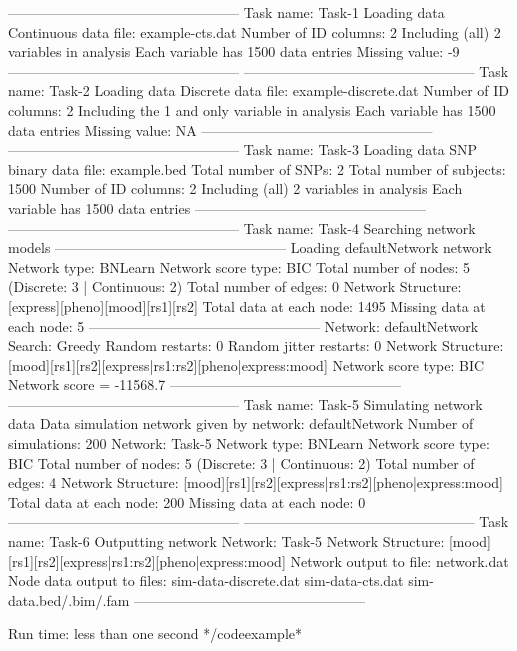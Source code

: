 -------------------------------------------------- Task name: Task-1 Loading data Continuous data file: example-cts.dat Number of ID columns: 2 Including (all) 2 variables in analysis Each variable has 1500 data entries Missing value: -9 -------------------------------------------------- -------------------------------------------------- Task name: Task-2 Loading data Discrete data file: example-discrete.dat Number of ID columns: 2 Including the 1 and only variable in analysis Each variable has 1500 data entries Missing value: NA -------------------------------------------------- -------------------------------------------------- Task name: Task-3 Loading data SNP binary data file: example.bed Total number of SNPs: 2 Total number of subjects: 1500 Number of ID columns: 2 Including (all) 2 variables in analysis Each variable has 1500 data entries -------------------------------------------------- -------------------------------------------------- Task name: Task-4 Searching network models -------------------------------------------------- Loading defaultNetwork network Network type: BNLearn Network score type: BIC Total number of nodes: 5 (Discrete: 3 | Continuous: 2) Total number of edges: 0 Network Structure: [express][pheno][mood][rs1][rs2] Total data at each node: 1495 Missing data at each node: 5 -------------------------------------------------- Network: defaultNetwork Search: Greedy Random restarts: 0 Random jitter restarts: 0 Network Structure: [mood][rs1][rs2][express|rs1:rs2][pheno|express:mood] Network score type: BIC Network score = -11568.7 -------------------------------------------------- -------------------------------------------------- Task name: Task-5 Simulating network data Data simulation network given by network: defaultNetwork Number of simulations: 200 Network: Task-5 Network type: BNLearn Network score type: BIC Total number of nodes: 5 (Discrete: 3 | Continuous: 2) Total number of edges: 4 Network Structure: [mood][rs1][rs2][express|rs1:rs2][pheno|express:mood] Total data at each node: 200 Missing data at each node: 0 -------------------------------------------------- -------------------------------------------------- Task name: Task-6 Outputting network Network: Task-5 Network Structure: [mood][rs1][rs2][express|rs1:rs2][pheno|express:mood] Network output to file: network.dat Node data output to files:
 sim-data-discrete.dat
 sim-data-cts.dat
 sim-data.bed/.bim/.fam
--------------------------------------------------

Run time: less than one second */codeexample*

